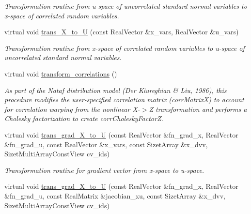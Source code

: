 \begin{DoxyCompactItemize}
\begin{DoxyCompactList}\small\item\em Transformation routine from u-\/space of uncorrelated standard normal variables to x-\/space of correlated random variables. \end{DoxyCompactList}\item 
virtual void \hyperlink{classPecos_1_1ProbabilityTransformation_a22c3e4ffde57732ffe3cbb7ab5fce86b}{trans\+\_\+\+X\+\_\+to\+\_\+U} (const Real\+Vector \&x\+\_\+vars, Real\+Vector \&u\+\_\+vars)\label{classPecos_1_1ProbabilityTransformation_a22c3e4ffde57732ffe3cbb7ab5fce86b}

\begin{DoxyCompactList}\small\item\em Transformation routine from x-\/space of correlated random variables to u-\/space of uncorrelated standard normal variables. \end{DoxyCompactList}\item 
virtual void \hyperlink{classPecos_1_1ProbabilityTransformation_a1be77b7133acb8e63d2c6957b9eb6265}{transform\+\_\+correlations} ()\label{classPecos_1_1ProbabilityTransformation_a1be77b7133acb8e63d2c6957b9eb6265}

\begin{DoxyCompactList}\small\item\em As part of the Nataf distribution model (Der Kiureghian \& Liu, 1986), this procedure modifies the user-\/specified correlation matrix (corr\+MatrixX) to account for correlation warping from the nonlinear X-\/$>$Z transformation and performs a Cholesky factorization to create corr\+Cholesky\+FactorZ. \end{DoxyCompactList}\item 
virtual void \hyperlink{classPecos_1_1ProbabilityTransformation_ae96fa589437ca113086aa590ac2e0901}{trans\+\_\+grad\+\_\+\+X\+\_\+to\+\_\+U} (const Real\+Vector \&fn\+\_\+grad\+\_\+x, Real\+Vector \&fn\+\_\+grad\+\_\+u, const Real\+Vector \&x\+\_\+vars, const Sizet\+Array \&x\+\_\+dvv, Sizet\+Multi\+Array\+Const\+View cv\+\_\+ids)\label{classPecos_1_1ProbabilityTransformation_ae96fa589437ca113086aa590ac2e0901}

\begin{DoxyCompactList}\small\item\em Transformation routine for gradient vector from x-\/space to u-\/space. \end{DoxyCompactList}\item 
virtual void \hyperlink{classPecos_1_1ProbabilityTransformation_af54120bc359031c6fb812013af1488e1}{trans\+\_\+grad\+\_\+\+X\+\_\+to\+\_\+U} (const Real\+Vector \&fn\+\_\+grad\+\_\+x, Real\+Vector \&fn\+\_\+grad\+\_\+u, const Real\+Matrix \&jacobian\+\_\+xu, const Sizet\+Array \&x\+\_\+dvv, Sizet\+Multi\+Array\+Const\+View cv\+\_\+ids)\label{classPecos_1_1ProbabilityTransformation_af54120bc359031c6fb812013af1488e1}


\end{DoxyCompactItemize}

